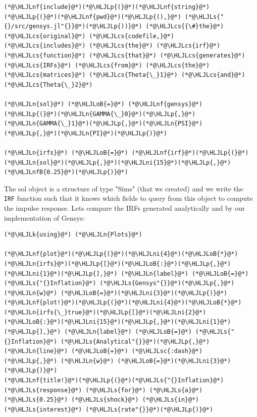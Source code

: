 \documentclass[12pt,a4paper]{article}
\newcommand{\HLJLk}[1]{\textcolor[RGB]{148,91,176}{\textbf{#1}}}
\newcommand{\HLJLn}[1]{#1}
\newcommand{\HLJLnf}[1]{\textcolor[RGB]{66,102,213}{#1}}
\newcommand{\HLJLs}[1]{\textcolor[RGB]{201,61,57}{#1}}
\newcommand{\HLJLsc}[1]{\textcolor[RGB]{201,61,57}{#1}}
\newcommand{\HLJLnfB}[1]{\textcolor[RGB]{59,151,46}{#1}}
\newcommand{\HLJLni}[1]{\textcolor[RGB]{59,151,46}{#1}}
\newcommand{\HLJLoB}[1]{\textcolor[RGB]{102,102,102}{\textbf{#1}}}
\newcommand{\HLJLp}[1]{#1}
\newcommand{\HLJLcs}[1]{\textcolor[RGB]{153,153,119}{\textit{#1}}}
\begin{document}
\begin{lstlisting}
(*@\HLJLnf{include}@*)(*@\HLJLp{(}@*)(*@\HLJLnf{string}@*)(*@\HLJLp{(}@*)(*@\HLJLnf{pwd}@*)(*@\HLJLp{(),}@*) (*@\HLJLs{"{}/src/gensys.jl"{}}@*)(*@\HLJLp{))}@*) (*@\HLJLcs{{\#}the}@*) (*@\HLJLcs{original}@*) (*@\HLJLcs{codefile,}@*) (*@\HLJLcs{includes}@*) (*@\HLJLcs{the}@*) (*@\HLJLcs{irf}@*) (*@\HLJLcs{function}@*) (*@\HLJLcs{that}@*) (*@\HLJLcs{generates}@*) (*@\HLJLcs{IRFs}@*) (*@\HLJLcs{from}@*) (*@\HLJLcs{the}@*) (*@\HLJLcs{matrices}@*) (*@\HLJLcs{Theta{\_}1}@*) (*@\HLJLcs{and}@*) (*@\HLJLcs{Theta{\_}2}@*)

(*@\HLJLn{sol}@*) (*@\HLJLoB{=}@*) (*@\HLJLnf{gensys}@*)(*@\HLJLp{(}@*)(*@\HLJLn{GAMMA{\_}0}@*)(*@\HLJLp{,}@*)(*@\HLJLn{GAMMA{\_}1}@*)(*@\HLJLp{,}@*)(*@\HLJLn{PSI}@*)(*@\HLJLp{,}@*)(*@\HLJLn{PI}@*)(*@\HLJLp{)}@*)

(*@\HLJLn{irfs}@*) (*@\HLJLoB{=}@*) (*@\HLJLnf{irf}@*)(*@\HLJLp{(}@*)(*@\HLJLn{sol}@*)(*@\HLJLp{,}@*)(*@\HLJLni{15}@*)(*@\HLJLp{,}@*)(*@\HLJLnfB{0.25}@*)(*@\HLJLp{)}@*)
\end{lstlisting}


The sol object is a structure of type "Sims" (that we created) and we write the \texttt{IRF} function such that it knows which fields to query from this object to compute the impulse response. Lets compare the IRFs generated analytically and by our implementation of Gensys:


\begin{lstlisting}
(*@\HLJLk{using}@*) (*@\HLJLn{Plots}@*)

(*@\HLJLnf{plot}@*)(*@\HLJLp{(}@*)(*@\HLJLni{4}@*)(*@\HLJLoB{*}@*)(*@\HLJLn{irfs}@*)(*@\HLJLp{[}@*)(*@\HLJLoB{:}@*)(*@\HLJLp{,}@*)(*@\HLJLni{1}@*)(*@\HLJLp{],}@*) (*@\HLJLn{label}@*) (*@\HLJLoB{=}@*) (*@\HLJLs{"{}Inflation}@*) (*@\HLJLs{Gensys"{}}@*)(*@\HLJLp{,}@*) (*@\HLJLn{w}@*) (*@\HLJLoB{=}@*)(*@\HLJLni{3}@*)(*@\HLJLp{)}@*)
(*@\HLJLnf{plot!}@*)(*@\HLJLp{(}@*)(*@\HLJLni{4}@*)(*@\HLJLoB{*}@*)(*@\HLJLn{irfs{\_}true}@*)(*@\HLJLp{[}@*)(*@\HLJLni{2}@*)(*@\HLJLoB{:}@*)(*@\HLJLni{15}@*)(*@\HLJLp{,}@*)(*@\HLJLni{1}@*)(*@\HLJLp{],}@*) (*@\HLJLn{label}@*) (*@\HLJLoB{=}@*) (*@\HLJLs{"{}Inflation}@*) (*@\HLJLs{Analytical"{}}@*)(*@\HLJLp{,}@*) (*@\HLJLn{line}@*) (*@\HLJLoB{=}@*) (*@\HLJLsc{:dash}@*)(*@\HLJLp{,}@*) (*@\HLJLn{w}@*) (*@\HLJLoB{=}@*)(*@\HLJLni{3}@*)(*@\HLJLp{)}@*)
(*@\HLJLnf{title!}@*)(*@\HLJLp{(}@*)(*@\HLJLs{"{}Inflation}@*) (*@\HLJLs{response}@*) (*@\HLJLs{for}@*) (*@\HLJLs{a}@*) (*@\HLJLs{0.25}@*) (*@\HLJLs{shock}@*) (*@\HLJLs{in}@*) (*@\HLJLs{interest}@*) (*@\HLJLs{rate"{}}@*)(*@\HLJLp{)}@*)
\end{lstlisting}
\end{document}
